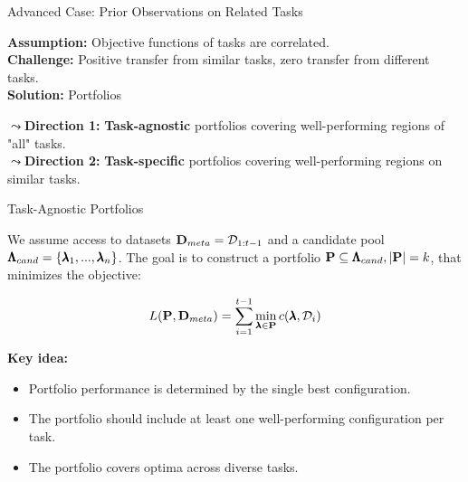 \documentclass[main]{subfiles}
\begin{document}
\begin{frame}{Advanced Case: Prior Observations on Related Tasks}

\textbf{Assumption:} Objective functions of tasks are correlated. \\
\textbf{Challenge:} Positive transfer from similar tasks, zero transfer from different tasks. \\
\textbf{Solution:} Portfolios

\vspace{1cm}

\textbf{$\leadsto$Direction 1:} \textbf{Task-agnostic} portfolios covering well-performing regions of "all" tasks. \\
\textbf{$\leadsto$Direction 2:} \textbf{Task-specific} portfolios covering well-performing regions on similar tasks.

\end{frame}
\begin{frame}{Task-Agnostic Portfolios}

We assume access to datasets $\mathbf{D}_{meta} = \mathcal{D}_{1:t-1}$ and a candidate pool $\pmb{\Lambda}_{cand} = \{\pmb{\lambda}_1, ..., \pmb{\lambda}_n\}$. The goal is to construct a portfolio $\mathbf{P} \subseteq \pmb{\Lambda}_{cand}, |\mathbf{P}| = k$, that minimizes the objective:

\begin{equation*}
L(\mathbf{P}, \mathbf{D}_{meta}) = \sum_{i=1}^{t-1} \min_{\pmb{\lambda} \in \mathbf{P}} c(\pmb{\lambda}, \mathcal{D}_i)
\end{equation*}

\textbf{Key idea:}
\begin{itemize}
    \item Portfolio performance is determined by the single best configuration.
    \item The portfolio should include at least one well-performing configuration per task.
    \item The portfolio covers optima across diverse tasks.
\end{itemize}

\end{frame}
\end{document}
